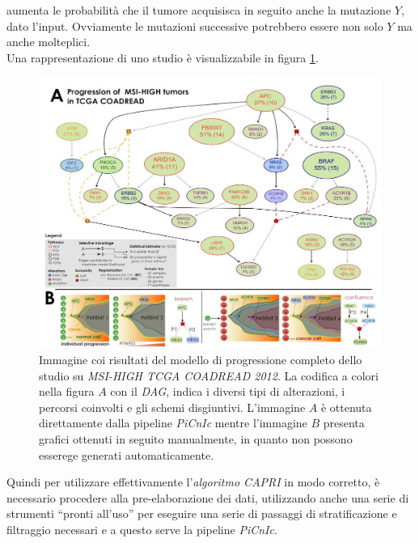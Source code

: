 \documentclass[a4paper,12pt, oneside]{book}
\begin{document}
aumenta le probabilità che il tumore acquisisca in seguito anche la mutazione
$Y$, dato l'input. Ovviamente le mutazioni successive potrebbero essere non
solo $Y$ ma anche molteplici.\\
Una rappresentazione di uno studio è visualizzabile in figura \ref{fig:resu}.
\begin{figure}
  \centering
  \includegraphics[scale = 0.35]{img/resc.jpg}
  \caption{Immagine coi risultati del modello di progressione completo dello
    studio su \textit{MSI-HIGH TCGA COADREAD 2012}. La codifica a colori nella
    figura $A$ con il \textit{DAG}, indica
    i diversi tipi di alterazioni, i percorsi coinvolti e gli schemi
    disgiuntivi. L'immagine $A$ è ottenuta direttamente dalla pipeline
    \textit{PiCnIc} mentre l'immagine $B$ presenta grafici ottenuti in seguito
    manualmente, in quanto non possono esserege generati automaticamente. }
  \label{fig:resu}
\end{figure}
Quindi per utilizzare effettivamente l'\textit{algoritmo CAPRI} in modo
corretto, è necessario procedere alla pre-elaborazione dei dati, utilizzando
anche una serie di strumenti ``pronti all'uso'' per eseguire una serie di
passaggi di stratificazione e filtraggio necessari e a questo serve la pipeline
\textit{PiCnIc}.
\end{document}
